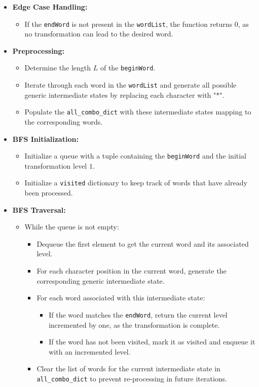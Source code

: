 \begin{itemize}
    \item \textbf{Edge Case Handling:}
    \begin{itemize}
        \item If the \texttt{endWord} is not present in the \texttt{wordList}, the function returns \(0\), as no transformation can lead to the desired word.
    \end{itemize}
    
    \item \textbf{Preprocessing:}
    \begin{itemize}
        \item Determine the length \(L\) of the \texttt{beginWord}.
        \item Iterate through each word in the \texttt{wordList} and generate all possible generic intermediate states by replacing each character with "\(*\)".
        \item Populate the \texttt{all\_combo\_dict} with these intermediate states mapping to the corresponding words.
    \end{itemize}
    
    \item \textbf{BFS Initialization:}
    \begin{itemize}
        \item Initialize a queue with a tuple containing the \texttt{beginWord} and the initial transformation level \(1\).
        \item Initialize a \texttt{visited} dictionary to keep track of words that have already been processed.
    \end{itemize}
    
    \item \textbf{BFS Traversal:}
    \begin{itemize}
        \item While the queue is not empty:
        \begin{itemize}
            \item Dequeue the first element to get the current word and its associated level.
            \item For each character position in the current word, generate the corresponding generic intermediate state.
            \item For each word associated with this intermediate state:
            \begin{itemize}
                \item If the word matches the \texttt{endWord}, return the current level incremented by one, as the transformation is complete.
                \item If the word has not been visited, mark it as visited and enqueue it with an incremented level.
            \end{itemize}
            \item Clear the list of words for the current intermediate state in \texttt{all\_combo\_dict} to prevent re-processing in future iterations.
        \end{itemize}
    \end{itemize}
    

\end{itemize}
